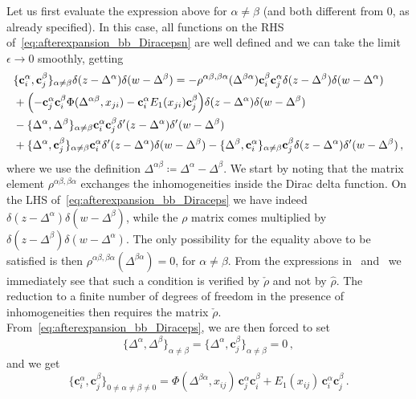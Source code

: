 Let us first evaluate the expression above for $\alpha \ne \beta$ (and both different from $0$, as already specified).
In this case, all functions on the RHS of~\eqref{eq:afterexpansion_bb_Diracepsn} are well defined and we can take the limit $\epsilon \to 0$ smoothly, getting
\begin{equation}
\label{eq:afterexpansion_bb_Diraceps}
\begin{split}
&\{\mathbf{c}_i^\alpha,\mathbf{c}_j^\beta\}_{\alpha \ne \beta} \delta(z-\Delta^\alpha) \delta(w-\Delta^\beta)=-\rho^{\alpha \beta, \beta \alpha}(\Delta^{\beta \alpha})
\mathbf{c}_i^\beta \mathbf{c}_j^\alpha\delta(z-\Delta^\beta) \delta(w-\Delta^\alpha) \\
&+\Bigl(- \mathbf{c}_j^\alpha \mathbf{c}_i^\beta   \Phi(\Delta^{\alpha \beta}, x_{ji})    - \mathbf{c}_i^\alpha E_1(x_{ji})    \mathbf{c}_j^\beta \Bigr) \delta(z-\Delta^\alpha) \delta(w-\Delta^\beta) \\
&-\{\Delta^\alpha,\Delta^\beta\}_{\alpha \ne \beta} \mathbf{c}_i^\alpha \mathbf{c}_j^\beta \delta'(z-\Delta^\alpha) \delta'(w-\Delta^\beta)\\
&+\{\Delta^\alpha ,\mathbf{c}_j^\beta\}_{\alpha \ne \beta} \mathbf{c}_i^\alpha \delta'(z-\Delta^\alpha) \delta(w-\Delta^\beta)-\{\Delta^\beta ,\mathbf{c}_i^\alpha\}_{\alpha \ne \beta} \mathbf{c}_j^\beta \delta(z-\Delta^\alpha) \delta'(w-\Delta^\beta) \,,
\end{split}
\end{equation}
where we use the definition $\Delta^{\alpha \beta} \coloneq \Delta^\alpha-\Delta^\beta$.
We start by noting that the matrix element $\rho^{\alpha \beta, \beta \alpha}$ exchanges the inhomogeneities inside the Dirac delta function. On the LHS of~\eqref{eq:afterexpansion_bb_Diraceps} we have indeed
$\delta(z-\Delta^\alpha) \delta(w-\Delta^\beta)$, while the $\rho$ matrix comes multiplied by $\delta(z-\Delta^\beta) \delta(w-\Delta^\alpha)$. The only possibility for the equality above to be satisfied is then $\rho^{\alpha \beta, \beta \alpha}(\Delta^{\beta \alpha})=0$, for $\alpha \ne \beta$. From the expressions in~ and~ we immediately see that such a condition is verified by $\check{\rho}$ and not by $\hat{\rho}$. The reduction to a finite number of degrees of freedom in the presence of inhomogeneities then requires the matrix $\check{\rho}$. From~\eqref{eq:afterexpansion_bb_Diraceps}, we are then forced to set
\begin{equation}\{\Delta^\alpha,\Delta^\beta\}_{\alpha \ne \beta}=\{\Delta^\alpha ,\mathbf{c}_j^\beta\}_{\alpha \ne \beta}=0\,,
\end{equation}
and we get
\begin{equation}
\label{eq:bb_aneb_noDir}
\{\mathbf{c}_i^\alpha,\mathbf{c}_j^\beta\}_{0 \ne \alpha \ne \beta \ne 0} = \Phi(\Delta^{\beta \alpha}, x_{ij})\, \mathbf{c}_j^\alpha \mathbf{c}_i^\beta + E_1(x_{ij})\, \mathbf{c}_i^\alpha \mathbf{c}_j^\beta \,.
\end{equation}

